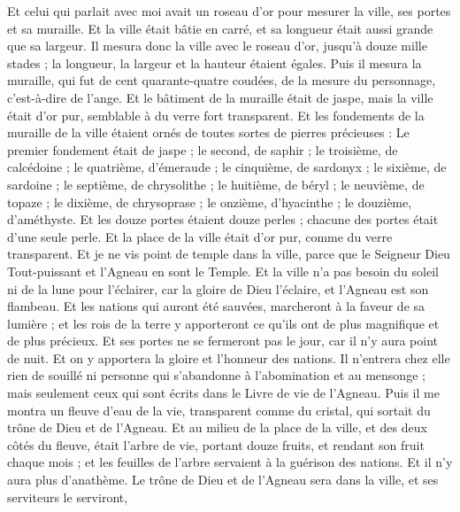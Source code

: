 \begin{multicols}{2}
Et celui qui parlait avec moi avait un roseau d'or pour mesurer la ville, ses portes et sa muraille.
Et la ville était bâtie en carré, et sa longueur était aussi grande que sa largeur. Il mesura donc la ville avec le roseau d'or, jusqu'à douze mille stades ; la longueur, la largeur et la hauteur étaient égales.
Puis il mesura la muraille, qui fut de cent quarante-quatre coudées, de la mesure du personnage, c'est-à-dire de l'ange.
Et le bâtiment de la muraille était de jaspe, mais la ville était d'or pur, semblable à du verre fort transparent.
Et les fondements de la muraille de la ville étaient ornés de toutes sortes de pierres précieuses{} : Le premier fondement était de jaspe ; le second, de saphir ; le troisième, de calcédoine ; le quatrième, d'émeraude ;
le cinquième, de sardonyx ; le sixième, de sardoine ; le septième, de chrysolithe ; le huitième, de béryl ; le neuvième, de topaze ; le dixième, de chrysoprase ; le onzième, d'hyacinthe ; le douzième, d'améthyste.
Et les douze portes étaient douze perles ; chacune des portes était d'une seule perle. Et la place de la ville était d'or pur, comme du verre transparent.
Et je ne vis point de temple dans la ville, parce que le Seigneur Dieu Tout-puissant et l'Agneau en sont le Temple.
Et la ville n'a pas besoin du soleil ni de la lune pour l’éclairer, car la gloire de Dieu l’éclaire, et l'Agneau est son flambeau{}.
Et les nations qui auront été sauvées, marcheront à la faveur de sa lumière ; et les rois de la terre y apporteront ce qu'ils ont de plus magnifique et de plus précieux.
Et ses portes ne se fermeront pas le jour, car il n'y aura point de nuit{}.
Et on y apportera la gloire et l’honneur des nations.
Il n’entrera chez elle rien de souillé ni personne qui s'abandonne à l'abomination et au mensonge ; mais seulement ceux qui sont écrits dans le Livre de vie de l'Agneau.
\VerseOne{}Puis il me montra un fleuve d'eau de la vie{}, transparent comme du cristal, qui sortait du trône de Dieu et de l'Agneau.
Et au milieu de la place de la ville, et des deux côtés du fleuve, était l'arbre de vie, portant douze fruits, et rendant son fruit chaque mois ; et les feuilles de l'arbre servaient à la guérison des nations{}.
Et il n’y aura plus d’anathème. Le trône de Dieu et de l'Agneau sera dans la ville, et ses serviteurs le serviront,

\end{multicols}
